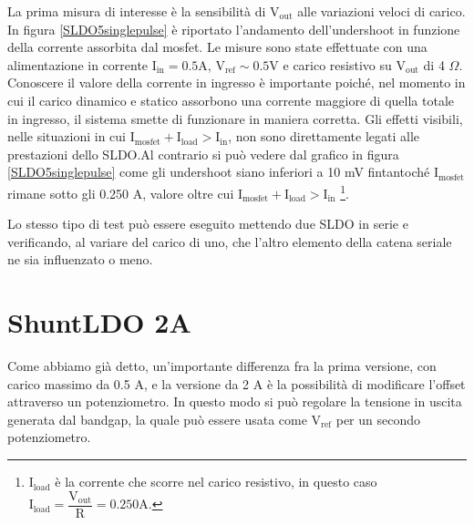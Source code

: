 La prima misura di interesse è la sensibilità di $\mathrm{V_{out}}$ alle variazioni veloci di carico.
In figura \ref{SLDO5singlepulse} è riportato l'andamento dell'undershoot in funzione della corrente assorbita dal mosfet.
Le misure sono state effettuate con una alimentazione in corrente $\mathrm{I_{in} = 0.5 A}$, $\mathrm{V_{ref} \sim 0.5 V}$ e carico resistivo su $\mathrm{V_{out}}$ di 4 $\Omega$. 
Conoscere il valore della corrente in ingresso è importante poiché, nel momento in cui il carico dinamico e statico assorbono una corrente maggiore di quella totale in ingresso, il sistema smette di funzionare in maniera corretta.
Gli effetti visibili, nelle situazioni in cui $\mathrm{I_{mosfet} + I_{load} > I_{in}}$, non sono direttamente legati alle prestazioni dello SLDO.Al contrario si può vedere dal grafico in figura \ref{SLDO5singlepulse} come gli undershoot siano inferiori a 10 mV fintantoché $\mathrm{I_{mosfet}}$ rimane sotto gli 0.250 A, valore oltre cui $\mathrm{I_{mosfet} + I_{load} > I_{in}}$
\footnote{
  $\mathrm{I_{load}}$ è la corrente che scorre nel carico resistivo, in questo caso $\mathrm{I_{load} = \dfrac{V_{out}}{R} = 0.250 A}$.
}. 

Lo stesso tipo di test può essere eseguito mettendo due SLDO in serie e verificando, al variare del carico di uno, che l'altro elemento della catena seriale ne sia influenzato o meno.


\section{ShuntLDO 2A}
Come abbiamo già detto, un'importante differenza fra la prima versione, con carico massimo da 0.5 A, e la versione da 2 A è la possibilità di modificare l'offset attraverso un potenziometro. In questo modo si può regolare la tensione in uscita generata dal bandgap, la quale può essere usata come $\mathrm{V_{ref}}$ per un secondo potenziometro.

